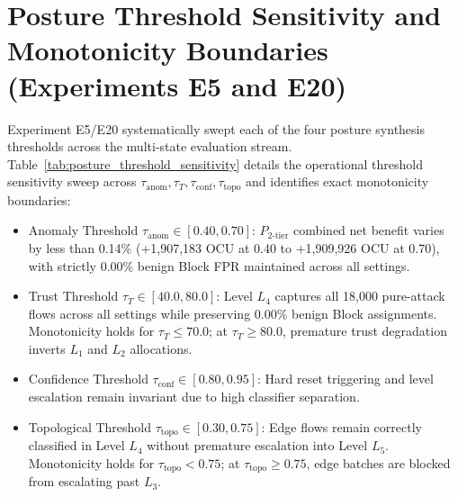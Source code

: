 \section{Posture Threshold Sensitivity and Monotonicity Boundaries (Experiments E5 and E20)}
\label{app:threshold_sensitivity}

Experiment E5/E20 systematically swept each of the four posture synthesis thresholds across the multi-state evaluation stream. Table~\ref{tab:posture_threshold_sensitivity} details the operational threshold sensitivity sweep across $\tau_{\text{anom}}, \tau_T, \tau_{\text{conf}}, \tau_{\text{topo}}$ and identifies exact monotonicity boundaries:
\begin{itemize}
  \item Anomaly Threshold $\tau_{\text{anom}} \in [0.40, 0.70]$: $P_{2\text{-tier}}$ combined net benefit varies by less than 0.14\% (+1,907,183 OCU at 0.40 to +1,909,926 OCU at 0.70), with strictly 0.00\% benign Block FPR maintained across all settings.
  \item Trust Threshold $\tau_T \in [40.0, 80.0]$: Level $L_4$ captures all 18,000 pure-attack flows across all settings while preserving 0.00\% benign Block assignments. Monotonicity holds for $\tau_T \le 70.0$; at $\tau_T \ge 80.0$, premature trust degradation inverts $L_1$ and $L_2$ allocations.
  \item Confidence Threshold $\tau_{\text{conf}} \in [0.80, 0.95]$: Hard reset triggering and level escalation remain invariant due to high classifier separation.
  \item Topological Threshold $\tau_{\text{topo}} \in [0.30, 0.75]$: Edge flows remain correctly classified in Level $L_4$ without premature escalation into Level $L_5$. Monotonicity holds for $\tau_{\text{topo}} < 0.75$; at $\tau_{\text{topo}} \ge 0.75$, edge batches are blocked from escalating past $L_3$.
\end{itemize}

